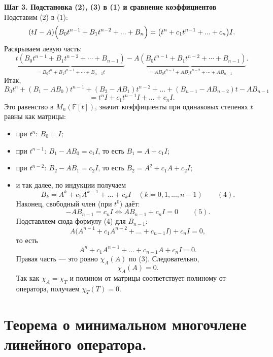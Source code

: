 \documentclass[14pt]{extreport}
\begin{document}
\begin{prbox}
        \textbf{Шаг 3. Подстановка (2), (3) в (1) и сравнение коэффициентов}\\
        Подставим (2) в (1):
        \[
        (tI-A) \Bigl( B_0t^{n-1} + B_1t^{n-2} + ... + B_n \Bigr) = \bigl( t^n + c_1t^{n-1} + ... + c_n \bigr) I.
        \]
        Раскрываем левую часть:
        \[
        \underbrace{t\left(B_0 t^{n-1} + B_1 t^{n-2} + \cdots + B_{n-1}\right)}_{= B_0 t^n + B_1 t^{n-1} + \cdots + B_{n-1} t} - \underbrace{A\left(B_0 t^{n-1} + B_1 t^{n-2} + \cdots + B_{n-1}\right)}_{= A B_0 t^{n-1} + A B_1 t^{n-2} + \cdots + A B_{n-1}}.
        \]
        Итак,
        \[
        B_0t^n + (B_1 - AB_0)t^{n-1} + (B_2 - AB_1)t^{n-2} + ... + (B_{n-1} - AB_{n-2})t - AB_{n-1} 
        \]
        \vspace{-1.2cm}
        \[
        = t^nI + c_1t^{n-1}I + ... + c_nI.
        \]
        Это равенство в $M_n(\mathbb{F}[t])$, значит коэффициенты при одинаковых степенях $t$ равны как матрицы:
        \begin{itemize}
            \item при $t^n:\ B_0=I$;
            \item при $t^{n-1}:\ B_1 - AB_0 = c_1I$, то есть $B_1 = A + c_1I$;
            \item при $t^{n-2}:\ B_2 - AB_1 = c_2I$, то есть $B_2 = A^2 + c_1A + c_2I$;
            \item и так далее, по индукции получаем
            \[
            B_k = A^k + c_1A^{k-1} + ... + c_kI \quad (k=0,1,...,n-1) \qquad (4).
            \]
            Наконец, свободный член (при $t^0$) даёт:
            \[
            -AB_{n-1} = c_nI \Leftrightarrow AB_{n-1} + c_nI = 0 \qquad (5).
            \]
            Подставляем сюда формулу (4) для $B_{n-1}$:
            \[
            A \bigl( A^{n-1} + c_1A^{n-2} + ... + c_{n-1}I \bigr) + c_nI = 0,
            \]
            то есть
            \[
            A^n + c_1A^{n-1} + ... + c_{n-1}A + c_nI = 0.
            \]
            Правая часть — это ровно $\chi_A(A)$ по (3). Следовательно,
            \[
            \chi_A(A) = 0.
            \]
            Так как $\chi_A = \chi_T$ и полином от матрицы соответствует полиному от оператора, получаем $\chi_T(T) = 0$.
        \end{itemize}
    \end{prbox}



    \chapter{Теорема о минимальном многочлене линейного оператора.}
\end{document}
